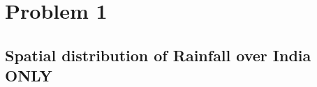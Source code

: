 \documentclass[a4paper,12pt]{article}
\begin{document}






\section{Problem 1 } \label{sec:q1}
\subsection{Spatial distribution of Rainfall over India ONLY}
\end{document}
